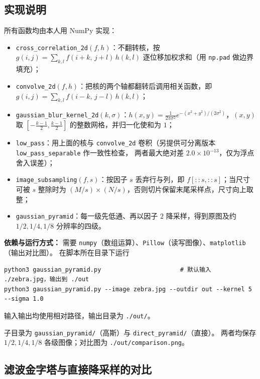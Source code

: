 \documentclass[11pt,a4paper]{ctexart}
\begin{document}
\subsection{实现说明}

所有函数均由本人用 NumPy 实现：

\begin{itemize}
  \item \texttt{cross\_correlation\_2d}$(f,h)$：不翻转核，按
        $g(i,j)=\sum_{k,l} f(i+k,\,j+l)\,h(k,l)$ 逐位移加权求和（用 \texttt{np.pad} 做边界填充）；
  \item \texttt{convolve\_2d}$(f,h)$：把核的两个轴都翻转后调用相关函数，即
        $g(i,j)=\sum_{k,l} f(i-k,\,j-l)\,h(k,l)$；
  \item \texttt{gaussian\_blur\_kernel\_2d}$(k,\sigma)$：$h(x,y)=\frac{1}{2\pi\sigma^{2}}
        e^{-(x^{2}+y^{2})/(2\sigma^{2})}$，$(x,y)$ 取 $[-\frac{k-1}{2},\frac{k-1}{2}]$ 的整数网格，并归一化使和为 $1$；
  \item \texttt{low\_pass}：用上面的核与 \texttt{convolve\_2d} 卷积（另提供可分离版本 \texttt{low\_pass\_separable} 作一致性检查，
        两者最大绝对差 $2.0\times10^{-13}$，仅为浮点舍入误差）；
  \item \texttt{image\_subsampling}$(f,s)$：按因子 $s$ 丢弃行与列，即 $f[::s,::s]$；当尺寸可被 $s$ 整除时为 $(M/s)\times(N/s)$，否则切片保留末尾采样点，尺寸向上取整；
  \item \texttt{gaussian\_pyramid}：每一级先低通、再以因子 $2$ 降采样，得到原图及约 $1/2,1/4,1/8$ 分辨率的四级。
\end{itemize}

\textbf{依赖与运行方式：} 需要 \texttt{numpy}（数组运算）、\texttt{Pillow}（读写图像）、\texttt{matplotlib}（输出对比图）。
在脚本所在目录下运行
\begin{lstlisting}
python3 gaussian_pyramid.py                      # 默认输入 ./zebra.jpg，输出到 ./out
python3 gaussian_pyramid.py --image zebra.jpg --outdir out --kernel 5 --sigma 1.0
\end{lstlisting}
输入输出均使用相对路径，输出目录为 \texttt{./out/}。

子目录为 \texttt{gaussian\_pyramid/}（高斯）与 \texttt{direct\_pyramid/}（直接）。
两者均保存 $1/2,1/4,1/8$ 各级图像；对比图为 \texttt{./out/comparison.png}。

\subsection{滤波金字塔与直接降采样的对比}
\end{document}
